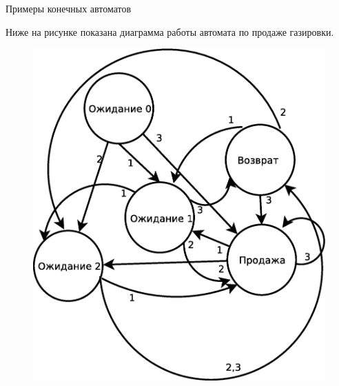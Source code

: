 \documentclass[12pt, pdf, hyperref={unicode},handout]{beamer}
\begin{document}
\begin{frame}{Примеры конечных автоматов}
  \begin{block}

    \small{
      Ниже на рисунке показана диаграмма работы автомата по продаже газировки.
      \begin{figure}[htb] 
    \centering
    \includegraphics [scale=0.7]{ris2.eps}
  \end{figure}
}

  \end{block}
  
\end{frame}
\end{document}
